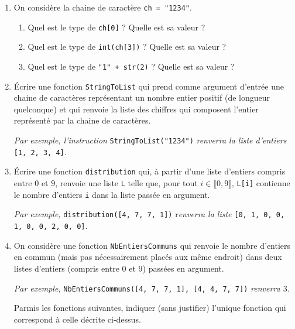 \documentclass[a4paper, 11pt,reqno]{article}
\begin{document}
\newpage
\begin{exercice}

\begin{enumerate}

\item On consid\`ere la chaine de caract\`ere \verb|ch = "1234"|.

\begin{enumerate}

\item Quel est le type de \verb|ch[0]| ? Quelle est sa valeur ?
\item Quel est le type de \verb|int(ch[3])| ? Quelle est sa valeur ?
\item Quel est le type de \verb|"1" + str(2)| ? Quelle est sa valeur ?

\end{enumerate}

\item \'Ecrire une fonction \verb|StringToList| qui prend comme argument d'entrée une chaine de caractères repr\'esentant un nombre entier positif (de longueur quelconque) et qui renvoie la liste des chiffres qui composent l'entier repr\'esent\'e par la chaine de caract\`eres.

\textit{Par exemple, l'instruction }\verb|StringToList("1234")| \textit{renverra la liste d'entiers }\verb|[1, 2, 3, 4]|.
\item \'Ecrire une fonction \verb|distribution| qui, \`a partir d'une liste d'entiers compris entre $0$ et $9$, renvoie une liste \verb|L| telle que, pour tout $i\in\llbracket0,9\rrbracket$, \verb|L[i]| contienne le nombre d'entiers \verb|i| dans la liste pass\'ee en argument.

\textit{Par exemple, }\verb|distribution([4, 7, 7, 1])| r\textit{enverra la liste} \verb|[0, 1, 0, 0, 1, 0, 0, 2, 0, 0]|.
\item On consid\`ere une fonction \verb|NbEntiersCommuns| qui renvoie le nombre d'entiers en commun (mais pas n\'ecessairement plac\'es aux m\^eme endroit) dans deux listes d'entiers (compris entre $0$ et $9$) pass\'ees en argument.

\textit{Par exemple,} \verb|NbEntiersCommuns([4, 7, 7, 1], [4, 4, 7, 7])| \textit{renverra $3$.}

Parmis les fonctions suivantes, indiquer (sans justifier) l'unique fonction qui correspond \`a celle d\'ecrite ci-dessus.


\end{enumerate}
\end{exercice}
\end{document}
